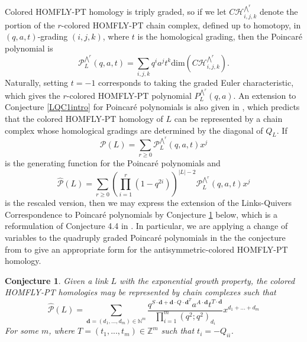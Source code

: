 \documentclass[11pt]{amsart}
\theoremstyle{plain}
\newtheorem{conjecture}{Conjecture}
\theoremstyle{definition}
\theoremstyle{remark}
\begin{document}
Colored HOMFLY-PT homology is triply graded, so if we let $C\mathcal{H}_{i,j,k}^{\bigwedge^r}$ denote the portion of the $r$-colored HOMFLY-PT chain complex, defined up to homotopy, in $(q,a,t)$-grading $(i,j,k)$, where $t$ is the homological grading, then the Poincar\'e polynomial is
\begin{equation}
\label{Poincarepoly}
    \mathcal{P}_L^{\bigwedge^r}(q,a,t)=\sum_{i,j,k}q^ia^jt^k \text{dim}(C\mathcal{H}_{i,j,k}^{\bigwedge^r}).
\end{equation}
Naturally, setting $t=-1$ corresponds to taking the graded Euler characteristic, which gives the $r$-colored HOMFLY-PT polynomial $P_L^{\bigwedge^r}(q,a)$. An extension to Conjecture \ref{LQC1intro} for Poincar\'e polynomials is also given in \cite{K19}, which predicts that the colored HOMFLY-PT homology of $L$ can be represented by a chain complex whose homological gradings are determined by the diagonal of $Q_L$. If
\begin{equation}
    \mathcal{P}(L)=\sum_{r\geq 0} \mathcal{P}_L^{\bigwedge^r}(q,a,t)x^j
\end{equation}
is the generating function for the Poincar\'e polynomials and
\begin{equation}
    \widehat{\mathcal{P}}(L)= \sum_{r\geq 0} \left(\prod_{i=1}^r (1-q^{2i})\right)^{|L|-2}\mathcal{P}_L^{\bigwedge^r}(q,a,t)x^j
\end{equation}
is the rescaled version, then we may express the extension of the Links-Quivers Correspondence to Poincar\'e polynomials by Conjecture \ref{Poincarepolyconj} below, which is a reformulation of Conjecture 4.4 in \cite{K19}. In particular, we are applying a change of variables to the quadruply graded Poincar\'e polynomials in the the conjecture from \cite{K19} to give an appropriate form for the antisymmetric-colored HOMFLY-PT homology.

\begin{conjecture}
\label{Poincarepolyconj}
    Given a link $L$ with the exponential growth property, the colored HOMFLY-PT homologies may be represented by chain complexes such that
    \begin{equation}
        \widehat{\mathcal{P}}(L)=\sum_{\textbf{d}=(d_1,...,d_m)\in \mathbb{N}^m} \frac{q^{S\cdot \textbf{d}+\textbf{d}\cdot Q \cdot\textbf{d}^T}a^{A\cdot \textbf{d}}t^{T\cdot\textbf{d}}}{\prod_{i=1}^m(q^2;q^2)_{d_i}}x^{d_1+...+d_m}
    \end{equation}
    For some $m$, where $T=(t_1,...,t_m)\in\mathbb{Z}^m$ such that $t_i=-Q_{ii}$.
\end{conjecture}
\end{document}
